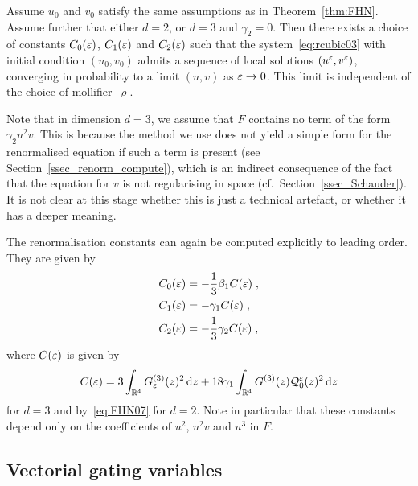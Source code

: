 \documentclass[reqno,11pt]{article}
\begin{document}
\begin{theorem}
\label{thm:cubic}
Assume $u_0$ and $v_0$ satisfy the same assumptions as in Theorem~\ref{thm:FHN}.
Assume further that either $d=2$, or $d=3$ and $\gamma_2=0$. Then there exists a
choice of constants $C_0(\varepsilon)$, $C_1(\varepsilon)$ and $C_2(\varepsilon)$ such that the
system~\eqref{eq:rcubic03} with initial condition $(u_0,v_0)$ admits a sequence
of local solutions $(u^\varepsilon,v^\varepsilon)$, converging in probability to a limit
$(u,v)$ as $\varepsilon\to0$. This limit is independent of the choice of
mollifier~$\varrho$.  
\end{theorem}

Note that in dimension $d=3$, we assume that $F$ contains no term of the form
$\gamma_2 u^2v$. This is because the method we use does not yield a simple form
for the renormalised equation if such a term is present (see
Section~\ref{ssec_renorm_compute}), which is an indirect consequence of the fact
that the equation for $v$ is not regularising in space
(cf.~Section~\ref{ssec_Schauder}). It is not clear at this stage whether this is
just a technical artefact, or whether it has a deeper meaning.

The renormalisation constants can again be computed explicitly to leading order.
They are given by 
\begin{align}
\nonumber
C_0(\eps) &= -\frac13 \beta_1 C(\eps)\;, \\
\label{eq:rcubic04} 
C_1(\eps) &= -\gamma_1 C(\eps)\;, \\
C_2(\eps) &= -\frac13 \gamma_2 C(\eps)\;,
\nonumber
\end{align}
where $C(\varepsilon)$ is given by 
\begin{equation}
 \label{eq:rcubic05}
 C(\eps) = 3\int_{\R^4}G^{(3)}_\eps(z)^2\6z
 + 18\gamma_1 \int_{\R^4}G^{(3)}(z)\cQ^\eps_0(z)^2\6z
\end{equation}
for $d=3$ and by~\eqref{eq:FHN07} for $d=2$. Note in particular that these
constants depend only on the coefficients of $u^2$, $u^2 v$ and $u^3$ in $F$. 


\subsection{Vectorial gating variables}
\label{ssec_rvect}
\end{document}
